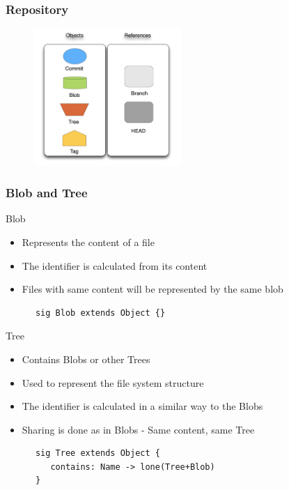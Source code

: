 \documentclass{beamer}
\begin{document}
\begin{frame}
\frametitle{Repository}
   \begin{figure}
      \centering
      \includegraphics[width=0.5\textwidth]{images/legenda2.png}
   \end{figure}
\end{frame}

\begin{frame}[fragile]
   \frametitle{Blob and Tree}
   \begin{block}{Blob}
      \begin{itemize}
         \item Represents the content of a file
         \item The identifier is calculated from its content
         \item Files with same content will be represented by the same blob
      \end{itemize}
      \tiny
      \color{blue}
      \begin{lstlisting}
      sig Blob extends Object {}
      \end{lstlisting}
   \end{block}
   \begin{block}{Tree}
      \begin{itemize}
         \item Contains Blobs or other Trees 
         \item Used to represent the file system structure
	      \item The identifier is calculated in a similar way to the Blobs
         \item Sharing is done as in Blobs - Same content, same Tree
      \end{itemize}
      \tiny
      \color{blue}
      \begin{lstlisting}
      sig Tree extends Object {
         contains: Name -> lone(Tree+Blob)
      }
      \end{lstlisting}
   \end{block}
\end{frame}
\end{document}

